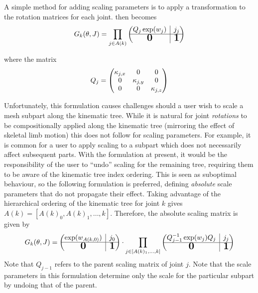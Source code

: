 A simple method for adding scaling parameters is to apply a transformation to the rotation matrices for each joint.  then becomes
\begin{equation}
    G_{k}(\pose,\smalrestjts) = \prod_{j \in A(k)} 
    \begin{pmatrix}
        Q_{j} \exp(w_{j})
        & \rvline 
        & j_{j} \\
    \hline
        \bigzero
        & \rvline 
        & \bigone
    \end{pmatrix}
\end{equation}

where the matrix
\begin{equation}
    Q_{j} = \begin{pmatrix}
        \kappa_{j,x} & 0 & 0 \\
        0 & \kappa_{j,y} & 0 \\
        0 & 0 & \kappa_{j,z}
    \end{pmatrix}
\end{equation}

Unfortunately, this formulation causes challenges should a user wish to scale a mesh subpart along the kinematic tree. While it is natural for joint \emph{rotations} to be compositionally applied along the kinematic tree (mirroring the effect of skeletal limb motion) this does not follow for scaling parameters. For example, it is common for a user to apply scaling to a subpart which does not necessarily affect subsequent parts. With the formulation at present, it would be the responsibility of the user to ``undo'' scaling for the remaining tree, requiring them to be aware of the kinematic tree index ordering. This is seen as suboptimal behaviour, so the following formulation is preferred, defining \emph{absolute} scale parameters that do not propagate their effect. Taking advantage of the hierarchical ordering of the kinematic tree for joint $k$ gives $A(k) = \left[A(k)_{0}, A(k)_{1}, \dots, k\right]$. Therefore, the absolute scaling matrix is given by
\begin{equation}
    G_{k}(\pose,\smalrestjts) = 
    \begin{pmatrix}
        \exp(w_{A(k,0)})
        & \rvline 
        & j_{0} \\
    \hline
        \bigzero
        & \rvline 
        & \bigone
    \end{pmatrix} \cdot
    \prod_{j \in \left[A(k)_{1}, \dots, k \right]}
        \begin{pmatrix}
            Q_{j-1}^{-1} \exp(w_{j}) Q_{j}
            & \rvline 
            & j_{j} \\
        \hline
            \bigzero
            & \rvline 
            & \bigone
        \end{pmatrix}
\end{equation}
Note that $Q_{j-1}$ refers to the parent scaling matrix of joint $j$. Note that the scale parameters in this formulation determine only the scale for the particular subpart by undoing that of the parent.

